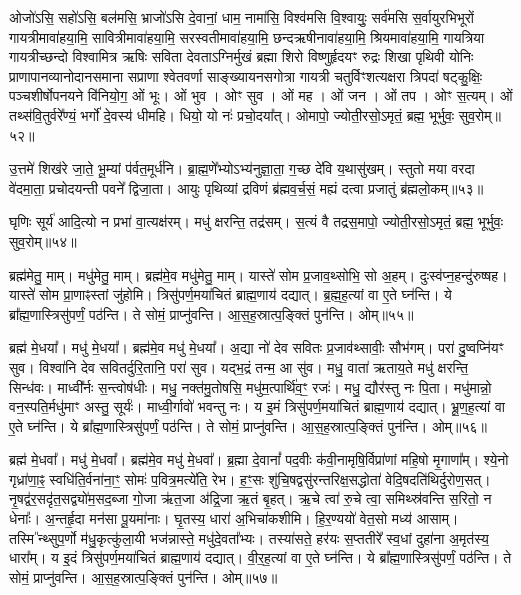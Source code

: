 ओजो॑ऽसि॒ सहो॑ऽसि॒ बल॑मसि॒ भ्राजो॑ऽसि दे॒वानां॒ धाम॒ नामा॑सि॒ विश्व॑मसि वि॒श्वायुः॒ सर्व॑मसि स॒र्वायुरभिभूरों गायत्रीमावा॑हया॒मि॒ सावित्रीमावा॑हया॒मि॒ सरस्वतीमावा॑ह\-या॒मि॒ छन्दऋषीनावा॑हया॒मि॒ श्रियमावा॑हया॒मि॒ गायत्रिया गायत्रीच्छन्दो विश्वामित्र ऋषिः सविता देवताऽग्निर्मुखं ब्रह्मा शिरो विष्णुर्\mbox{}हृदयꣳ रुद्रः शिखा पृथिवी योनिः प्राणापानव्यानोदानसमाना सप्राणा श्वेतवर्णा साङ्ख्यायनसगोत्रा गायत्री चतुर्विꣳशत्यक्षरा त्रिपदा॑ षट्कु॒क्षिः॒ पञ्चशीर्\mbox{}षोपनयने वि॑नियो॒ग॒ ओं भूः। 
ओं भुव। 
ओꣳ सुव। 
ओं मह। 
ओं जन। 
ओं तप। 
ओꣳ स॒त्यम्। 
ओं तथ्स॑वि॒तुर्वरे᳚ण्यं॒ भर्गो॑ दे॒वस्य॑ धीमहि। 
धियो॒ यो नः॑ प्रचो॒दया᳚त्। 
ओमापो॒ ज्योती॒रसो॒ऽमृतं॒ ब्रह्म॒ भूर्भुवः॒ सुव॒रोम्॥५२॥
\anuvakamend

उ॒त्तमे॑ शिख॑रे जा॒ते॒ भू॒म्यां प॑र्वत॒मूर्ध॑नि। 
ब्रा॒ह्म॒णे᳚भ्योऽभ्य॑नु\-ज्ञा॒ता॒ ग॒च्छ दे॑वि य॒थासु॑खम्। 
स्तुतो मया वरदा वे॑दमा॒ता॒ प्रचोदयन्ती पवने᳚ द्विजा॒ता। 
आयुः पृथिव्यां द्रविणं ब्र॑ह्मव॒र्च॒सं॒ मह्यं दत्वा प्रजातुं ब्र॑ह्मलो॒कम्॥५३॥
\anuvakamend

घृणिः सूर्य॑ आदि॒त्यो न प्रभा॑ वा॒त्यक्ष॑रम्। 
मधु॑ क्षरन्ति॒ तद्र॑सम्। 
स॒त्यं वै तद्रस॒मापो॒ ज्योती॒रसो॒ऽमृतं॒ ब्रह्म॒ भूर्भुवः॒ सुव॒रोम्॥५४॥\anuvakamend

ब्रह्म॑मेतु॒ माम्। 
मधु॑मेतु॒ माम्। 
ब्रह्म॑मे॒व मधु॑मेतु॒ माम्। 
यास्ते॑ सोम प्र॒जाव॒थ्सोभि॒ सो अ॒हम्। 
दुःस्व॑प्न॒हन्दु॑रुष्षह। 
यास्ते॑ सोम प्रा॒णाꣴस्तां जु॑होमि। 
त्रिसु॑पर्ण॒मया॑चितं ब्राह्म॒णाय॑ दद्यात्। 
ब्र॒ह्म॒ह॒त्यां वा ए॒ते घ्न॑न्ति। 
ये ब्रा᳚ह्म॒णास्त्रिसु॑पर्णं॒ पठ॑न्ति। 
ते सोमं॒ प्राप्नु॑वन्ति। 
आ॒स॒ह॒स्रात्प॒ङ्क्तिं पुन॑न्ति। 
ओम्॥५५॥
\anuvakamend

ब्रह्म॑ मे॒धया᳚। 
मधु॑ मे॒धया᳚। 
ब्रह्म॑मे॒व मधु॑ मे॒धया᳚। 
अ॒द्या नो॑ देव सवितः प्र॒जाव॑थ्सावीः॒ सौभ॑गम्। 
परा॑ दु॒ष्वप्नि॑यꣳ सुव। 
विश्वा॑नि देव सवितर्दुरि॒तानि॒ परा॑ सुव। 
यद्भ॒द्रं तन्म॒ आ सु॑व। 
मधु॒ वाता॑ ऋताय॒ते मधु॑ क्षरन्ति॒ सिन्ध॑वः। 
माध्वी᳚र्नः स॒न्त्वोष॑धीः। 
मधु॒ नक्त॑मु॒तोषसि॒ मधु॑म॒त्पार्थि॑व॒ꣳ॒ रजः॑। 
मधु॒ द्यौर॑स्तु नः पि॒ता। 
मधु॑मान्नो॒ वन॒स्पति॒र्मधु॑माꣳ अस्तु॒ सूर्यः॑। 
माध्वी॒र्गावो॑ भवन्तु नः। 
य इ॒मं त्रिसु॑पर्ण॒मया॑चितं ब्राह्म॒णाय॑ दद्यात्। 
भ्रू॒ण॒ह॒त्यां वा ए॒ते घ्न॑न्ति। 
ये ब्रा᳚ह्म॒णास्त्रिसु॑पर्णं॒ पठ॑न्ति। 
ते सोमं॒ प्राप्नु॑वन्ति। 
आ॒स॒ह॒स्रात्प॒ङ्क्तिं पुन॑न्ति। 
ओम्॥५६॥
\anuvakamend


ब्रह्म॑ मे॒धवा᳚। 
मधु॑ मे॒धवा᳚। 
ब्रह्म॑मे॒व मधु॑ मे॒धवा᳚। 
ब्र॒ह्मा दे॒वानां᳚ पद॒वीः क॑वी॒नामृषि॒र्विप्रा॑णां महि॒षो मृ॒गाणा᳚म्। 
श्ये॒नो गृध्रा॑णा॒ꣴ॒ स्वधि॑ति॒र्वना॑ना॒ꣳ॒ सोमः॑ प॒वित्र॒मत्ये॑ति॒ रेभ\sn{}। 
ह॒ꣳ॒सः शु॑चि॒षद्वसु॑रन्तरिक्ष॒सद्धोता॑ वेदि॒षदति॑थिर्दुरोण॒सत्। 
नृ॒षद्व॑र॒सदृ॑त॒सद्व्यो॑म॒सद॒ब्जा गो॒जा ऋ॑त॒जा अ॑द्रि॒जा ऋ॒तं बृ॒हत्। 
ऋ॒चे त्वा॑ रु॒चे त्वा॒ समिथ्स्र॑वन्ति स॒रितो॒ न धेनाः᳚। 
अ॒न्तर्\mbox{}हृ॒दा मन॑सा पू॒यमा॑नाः। 
घृ॒तस्य॒ धारा॑ अ॒भिचा॑कशीमि। 
हि॒र॒ण्ययो॑ वेत॒सो मध्य॑ आसाम्। 
\mbox{तस्मि ᳚\hspace{-1.25ex}न्थ्सु}\-प॒र्णो म॑धु॒कृत्कु॑ला॒यी भज॑न्नास्ते॒ मधु॑\-दे॒वता᳚भ्यः। 
तस्या॑सते॒ हर॑यः स॒प्ततीरे᳚ स्व॒धां दुहा॑ना अ॒मृत॑स्य॒ धारा᳚म्। 
य इ॒दं त्रिसु॑पर्ण॒मया॑चितं ब्राह्म॒णाय॑ दद्यात्। 
वी॒र॒ह॒त्यां वा ए॒ते घ्न॑न्ति। 
ये ब्रा᳚ह्म॒णास्त्रिसु॑पर्णं॒ पठ॑न्ति। 
ते सोमं॒ प्राप्नु॑वन्ति। 
आ॒स॒ह॒स्रात्प॒ङ्क्तिं पुन॑न्ति। 
ओम्॥५७॥
\anuvakamend

